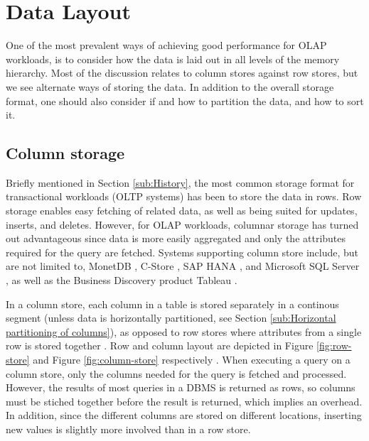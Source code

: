\chapter{Data Layout}
\label{chap:Data Layout}
One of the most prevalent ways of achieving good performance for OLAP workloads, is to consider how the data is laid out in all levels of the memory hierarchy. Most of the discussion relates to column stores against row stores, but we see alternate ways of storing the data. In addition to the overall storage format, one should also consider if and how to partition the data, and how to sort it.
\newpage

\section{Column storage}
\label{sec:Column storage}
Briefly mentioned in Section \ref{sub:History}, the most common storage format for transactional workloads (OLTP systems) has been to store the data in rows. Row storage enables easy fetching of related data, as well as being suited for updates, inserts, and deletes. However, for OLAP workloads, columnar storage has turned out advantageous since data is more easily aggregated and only the attributes required for the query are fetched. Systems supporting column store include, but are not limited to, MonetDB \cite{Boncz2002-yj, Boncz2005-wj}, C-Store \cite{Stonebraker2005-qz}, SAP HANA \cite{Farber2012-vh}, and Microsoft SQL Server \cite{Larson2013-mc, noauthor_undated-vq}, as well as the Business Discovery product Tableau \cite{Kamkolkar2015-iq}. 

In a column store, each column in a table is stored separately in a continous segment (unless data is horizontally partitioned, see Section \ref{sub:Horizontal partitioning of columns}), as opposed to row stores where attributes from a single row is stored together \cite{Bjorklund2011-wh}. Row and column layout are depicted in Figure \ref{fig:row-store} and Figure \ref{fig:column-store} respectively . When executing a query on a column store, only the columns needed for the query is fetched and processed. However, the results of most queries in a DBMS is returned as rows, so columns must be stiched together before the result is returned, which implies an overhead. In addition, since the different columns are stored on different locations, inserting new values is slightly more involved than in a row store. 

